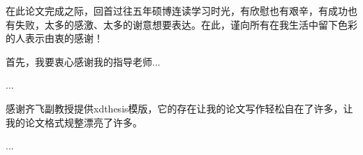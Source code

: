
\begin{acknowledgments}

在此论文完成之际，回首过往五年硕博连读学习时光，有欣慰也有艰辛，有成功也有失败，太多的感激、太多的谢意想要表达。在此，谨向所有在我生活中留下色彩的人表示由衷的感谢！

首先，我要衷心感谢我的指导老师...

...

感谢齐飞副教授提供xdthesis模版，它的存在让我的论文写作轻松自在了许多，让我的论文格式规整漂亮了许多。

...

\end{acknowledgments}


